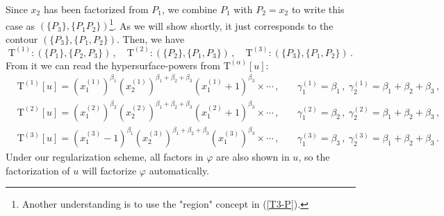 \documentclass[a4paper,11pt]{article}
\newcommand{\nn}{\nonumber}
\newcommand{\nT}{\mathrm{T}}
\def\eref#1{(\ref{#1})}
\begin{document}
Since $x_2$ has been factorized from $P_1$, we combine $P_1$ with $P_2=x_2$ to write  this case as $(\{P_3\},\{P_1 P_2\})$\footnote{  Another understanding is to use the "region" concept in \eref{T3-P}. }. As we will show shortly, it just corresponds to the contour $(\{P_3\},\{P_1,P_2\})$. Then, we have
\begin{equation}
\nT^{(1)}: (\{P_1\},\{P_2,P_3\})   \, , \quad \nT^{(2)}: (\{P_2\},\{P_1,P_3\})   \, , \quad   \nT^{(3)}: (\{P_3\},\{P_1,P_2\})  \, . \label{eq:Cofdegenerate}
\end{equation}
From it we can read the hypersurface-powers from $\nT^{(\alpha)}[u]$:
\begin{align}
&\nT^{(1)}[u] =  \left(x_1^{(1)} \right)^{\beta _1} \left(x_2^{(1)}\right)^{\beta
   _1+\beta_2+\beta_3} 
 \left(x_1^{(1)}+1\right)^{\beta _3}  \times \cdots  \, ,\quad
&\gamma^{(1)}_1=\beta_1 \,,\ \gamma^{(1)}_2=\beta_1  +\beta_2+\beta_3 \, , \nn\\
&\nT^{(2)}[u] = \left(x_1^{(2)} \right)^{\beta _2} \left(x_2^{(2)}\right)^{\beta
   _1+\beta _2+\beta _3} \left(x_1^{(2)}+1\right)^{\beta _3}  \times \cdots  \, ,\quad 
& \gamma^{(2)}_1=\beta_2 \,,\ \gamma^{(2)}_2=\beta_1+\beta_2+\beta_3 \, , \nn\\
&\nT^{(3)}[u] = \left(x_1^{(3)}-1\right)^{\beta
   _1}  \left(x_2^{(3)} \right)^{\beta_1 + \beta _2 + \beta_3} 
 \left(x_1^{(3)}\right)^{\beta _3}  \times \cdots  \, ,\quad
&\gamma^{(3)}_1=\beta_3 \,,\ \gamma^{(3)}_2=\beta_1+\beta_2+\beta_3  \, . \label{eq:examfactorize}
\end{align}
Under our regularization scheme, all factors in $\varphi$ are also shown in $u$, so the factorization of $u$ will factorize $\varphi$ automatically. 
\end{document}
